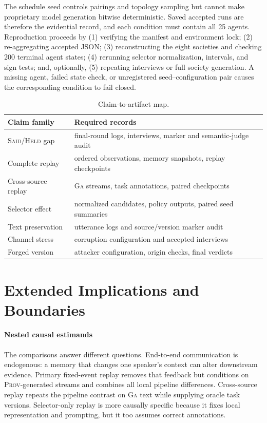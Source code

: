 \documentclass[sigconf,anonymous]{acmart}
\newcommand{\said}{\textsc{Said}}
\newcommand{\held}{\textsc{Held}}
\newcommand{\prov}{\textsc{Prov}}
\newcommand{\ga}{\textsc{Ga}}
\begin{document}
The schedule seed controls pairings and topology sampling but cannot make proprietary model
generation bitwise deterministic.  Saved accepted runs are therefore the evidential record, and
each condition must contain all 25 agents.  Reproduction proceeds by (1) verifying the manifest
and environment lock; (2) re-aggregating accepted JSON; (3) reconstructing the eight societies
and checking 200 terminal agent states; (4) rerunning selector normalization, intervals, and
sign tests; and, optionally, (5) repeating interviews or full society generation.  A missing
agent, failed state check, or unregistered seed--configuration pair causes the corresponding
condition to fail closed.

\begin{table}[!ht]
  \caption{Claim-to-artifact map.}
  \label{tab:app-artifacts}
  \centering
  \small
  \begin{tabular}{@{}p{2.3cm}p{4.7cm}@{}}
    \toprule
    Claim family & Required records \\
    \midrule
    \said{}/\held{} gap & final-round logs, interviews, marker and semantic-judge audit \\
    Complete replay & ordered observations, memory snapshots, replay checkpoints \\
    Cross-source replay & \ga{} streams, task annotations, paired checkpoints \\
    Selector effect & normalized candidates, policy outputs, paired seed summaries \\
    Text preservation & utterance logs and source/version marker audit \\
    Channel stress & corruption configuration and accepted interviews \\
    Forged version & attacker configuration, origin checks, final verdicts \\
    \bottomrule
  \end{tabular}
\end{table}
\FloatBarrier

\section{Extended Implications and Boundaries}
\label{app:extended-boundaries}

\paragraph{Nested causal estimands}
\label{app:causal-scope}
The comparisons answer different questions.  End-to-end communication is endogenous: a memory
that changes one speaker's context can alter downstream evidence.  Primary fixed-event replay
removes that feedback but conditions on \prov{}-generated streams and combines all local pipeline
differences.  Cross-source replay repeats the pipeline contrast on \ga{} text while supplying
oracle task versions.  Selector-only replay is more causally specific because it fixes local
representation and prompting, but it too assumes correct annotations.
\end{document}
